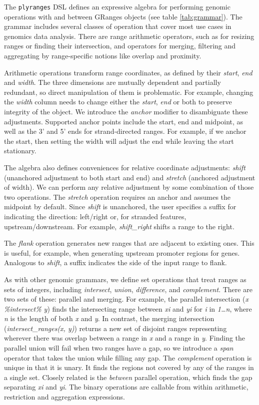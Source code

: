 \documentclass[]{article}
\begin{document}
The \texttt{plyranges} DSL defines an expressive algebra for performing
genomic operations with and between GRanges objects (see table
\ref{tab:grammar}). The grammar includes several classes of operation
that cover most use cases in genomics data analysis. There are range
arithmetic operators, such as for resizing ranges or finding their
intersection, and operators for merging, filtering and aggregating by
range-specific notions like overlap and proximity.

Arithmetic operations transform range coordinates, as defined by their
\emph{start}, \emph{end} and \emph{width}. The three dimensions are
mutually dependent and partially redundant, so direct manipulation of
them is problematic. For example, changing the \emph{width} column needs
to change either the \emph{start}, \emph{end} or both to preserve
integrity of the object. We introduce the \emph{anchor} modifier to
disambiguate these adjustments. Supported anchor points include the
start, end and midpoint, as well as the 3' and 5' ends for
strand-directed ranges. For example, if we anchor the start, then
setting the width will adjust the end while leaving the start
stationary.

The algebra also defines conveniences for relative coordinate
adjustments: \emph{shift} (unanchored adjustment to both start and end)
and \emph{stretch} (anchored adjustment of width). We can perform any
relative adjustment by some combination of those two operations. The
\emph{stretch} operation requires an anchor and assumes the midpoint by
default. Since \emph{shift} is unanchored, the user specifies a suffix
for indicating the direction: left/right or, for stranded features,
upstream/downstream. For example, \emph{shift\_right} shifts a range to
the right.

The \emph{flank} operation generates new ranges that are adjacent to
existing ones. This is useful, for example, when generating upstream
promoter regions for genes. Analogous to \emph{shift}, a suffix
indicates the side of the input range to flank.

As with other genomic grammars, we define set operations that treat
ranges as sets of integers, including \emph{intersect}, \emph{union},
\emph{difference}, and \emph{complement}. There are two sets of these:
parallel and merging. For example, the parallel intersection (\emph{x
\%intersect\% y}) finds the intersecting range between \emph{xi} and
\emph{yi} for \emph{i} in \emph{1\ldots{}n}, where \emph{n} is the
length of both \emph{x} and \emph{y}. In contrast, the merging
intersection (\emph{intersect\_ranges(x, y)}) returns a new set of
disjoint ranges representing wherever there was overlap between a range
in \emph{x} and a range in \emph{y}. Finding the parallel union will
fail when two ranges have a gap, so we introduce a \emph{span} operator
that takes the union while filling any gap. The \emph{complement}
operation is unique in that it is unary. It finds the regions not
covered by any of the ranges in a single set. Closely related is the
\emph{between} parallel operation, which finds the gap separating
\emph{xi} and \emph{yi}. The binary operations are callable from within
arithmetic, restriction and aggregation expressions.
\end{document}
